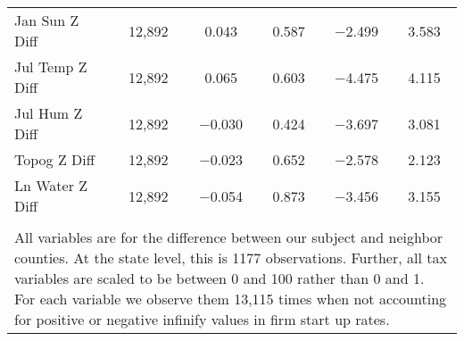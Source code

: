 \begin{table}[!htbp]
\begin{tabular}{@{\extracolsep{5pt}}lccccc}
Jan Sun Z Diff & 12,892 & 0.043 & 0.587 & $-$2.499 & 3.583 \\ 
Jul Temp Z Diff & 12,892 & 0.065 & 0.603 & $-$4.475 & 4.115 \\ 
Jul Hum Z Diff & 12,892 & $-$0.030 & 0.424 & $-$3.697 & 3.081 \\ 
Topog Z Diff & 12,892 & $-$0.023 & 0.652 & $-$2.578 & 2.123 \\ 
Ln Water Z Diff & 12,892 & $-$0.054 & 0.873 & $-$3.456 & 3.155 \\ 
\hline \\[-1.8ex] 
\multicolumn{6}{l}{All variables are for the difference between our subject and neighbor counties. At the state level, this is 1177 observations. Further, all tax variables are scaled to be between 0 and 100 rather than 0 and 1. For each variable we observe them 13,115 times when not accounting for positive or negative infinify values in firm start up rates.} \\ 
\end{tabular} 
\end{table} 

